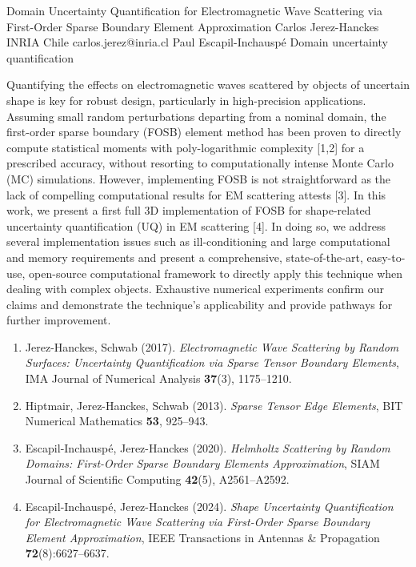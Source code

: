 \begin{talk}
  {Domain Uncertainty Quantification for Electromagnetic Wave Scattering via First-Order Sparse Boundary Element Approximation}%
  {Carlos Jerez-Hanckes}%
  {INRIA Chile}%
  {carlos.jerez@inria.cl}%
  {Paul Escapil-Inchausp\'e}%
  {Domain uncertainty quantification}%
    
   
Quantifying the effects on electromagnetic waves scattered by objects of uncertain shape is key for robust design, particularly in high-precision applications. Assuming small random perturbations departing from a nominal domain, the first-order sparse boundary (FOSB) element method has been proven to directly compute statistical moments with poly-logarithmic complexity [1,2] for a prescribed accuracy, without resorting to computationally intense Monte Carlo (MC) simulations. However, implementing FOSB is not straightforward as the lack of compelling computational results for EM scattering attests [3]. In this work, we present a first full 3D implementation of FOSB for shape-related uncertainty quantification (UQ) in EM scattering [4]. In doing so, we address several implementation issues such as ill-conditioning and large computational and memory requirements and present a comprehensive, state-of-the-art, easy-to-use, open-source computational framework to directly apply this technique when dealing with complex objects. Exhaustive numerical experiments confirm our claims and demonstrate the technique's applicability and provide pathways for further improvement.

\medskip

\begin{enumerate}
 \item[{[1]}] Jerez-Hanckes, Schwab (2017). {\it Electromagnetic Wave Scattering by Random Surfaces: Uncertainty Quantification via Sparse Tensor Boundary Elements}, IMA Journal of Numerical Analysis {\bf 37}(3), 1175--1210.
 \item[{[2]}] Hiptmair, Jerez-Hanckes, Schwab (2013). {\it Sparse Tensor Edge Elements}, BIT Numerical Mathematics {\bf 53}, 925--943.
 \item[{[3]}] Escapil-Inchausp\'e, Jerez-Hanckes (2020). {\it Helmholtz Scattering by Random Domains: First-Order Sparse Boundary Elements Approximation}, SIAM Journal of Scientific Computing {\bf 42}(5), A2561--A2592.
 \item[{[4]}] Escapil-Inchausp\'e, Jerez-Hanckes (2024). {\it Shape Uncertainty Quantification for Electromagnetic Wave Scattering via First-Order Sparse Boundary Element Approximation}, IEEE Transactions in Antennas \& Propagation {\bf 72}(8):6627--6637.
\end{enumerate}


\end{talk}
